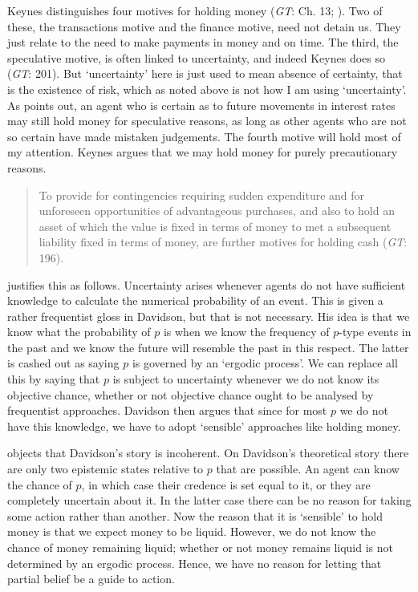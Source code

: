 Keynes distinguishes four motives for holding money (\textit{GT}: Ch. 13; \cite[215-223]{Keynes1937b}). Two of these, the transactions motive and the finance motive, need not detain us. They just relate to the need to make payments in money and on time. The third, the speculative motive, is often linked to uncertainty, and indeed Keynes does so (\textit{GT}: 201). But `uncertainty' here is just used to mean absence of certainty, that is the existence of risk, which as noted above is not how I am using `uncertainty'. As \citet{Runde1994b} points out, an agent who is certain as to future movements in interest rates may still hold money for speculative reasons, as long as other agents who are not so certain have made mistaken judgements. The fourth motive will hold most of my attention. Keynes argues that we may hold money for purely precautionary reasons.

\begin{quote}
To provide for contingencies requiring sudden expenditure and for unforeseen opportunities of advantageous purchases, and also to hold an asset of which the value is fixed in terms of money to met a subsequent liability fixed in terms of money, are further motives for holding cash (\textit{GT}: 196).
\end{quote}

\noindent \citet{Davidson1988, Davidson1991} justifies this as follows. Uncertainty arises whenever agents do not have sufficient knowledge to calculate the numerical probability of an event. This is given a rather frequentist gloss in Davidson, but that is not necessary. His idea is that we know what the probability of \(p\) is when we know the frequency of \(p\)-type events in the past and we know the future will resemble the past in this respect. The latter is cashed out as saying \(p\) is governed by an `ergodic process'. We can replace all this by saying that \(p\) is subject to uncertainty whenever we do not know its objective chance, whether or not objective chance ought to be analysed by frequentist approaches. Davidson then argues that since for most \(p\) we do not have this knowledge, we have to adopt `sensible' approaches like holding money.

\citet{Runde1994b} objects that Davidson's story is incoherent. On Davidson's theoretical story there are only two epistemic states relative to \(p\) that are possible. An agent can know the chance of \(p\), in which case their credence is set equal to it, or they are completely uncertain about it. In the latter case there can be no reason for taking some action rather than another. Now the reason that it is `sensible' to hold money is that we expect money to be liquid. However, we do not know the chance of money remaining liquid; whether or not money remains liquid is not determined by an ergodic process. Hence, we have no reason for letting that partial belief be a guide to action.

